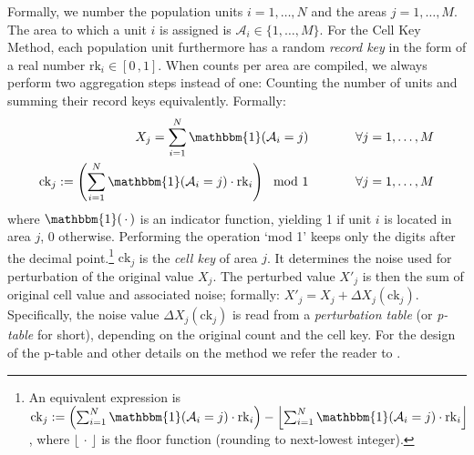 Formally, we number the population units $i = 1, \dots, N$ and the areas $j = 1, \dots, M$. The area to which a unit $i$ is assigned is $\mathcal{A}_i \in \{1, \dots, M\}$. For the Cell Key Method, each population unit furthermore has a random \emph{record key} in the form of a real number $\mathrm{rk}_i \in [0 \,, 1]$. When counts per area are compiled, we always perform two aggregation steps instead of one: Counting the number of units and summing their record keys equivalently. Formally:
\begin{equation}
\begin{aligned}
    X_j = \sum_{i=1}^N \mathbbm{1}(\mathcal{A}_i = j) \hspace{1.3cm} \forall j = 1, \dots, M \\
    \mathrm{ck}_j := \left(\sum_{i=1}^N \mathbbm{1}(\mathcal{A}_i = j) \cdot \mathrm{rk}_i \right) \mod 1 \hspace{1.3cm} \forall j = 1, \dots, M
\end{aligned}
\end{equation}
where $\mathbbm{1}(\,\cdot\,)$ is an indicator function, yielding 1 if unit $i$ is located in area $j$, 0 otherwise. Performing the operation `mod 1' keeps only the digits after the decimal point.\footnote{
    An equivalent expression is $\mathrm{ck}_j := \left (\sum_{i=1}^N \mathbbm{1}(\mathcal{A}_i = j) \cdot \mathrm{rk}_i \right ) - \left\lfloor \sum_{i=1}^N \mathbbm{1}(\mathcal{A}_i = j) \cdot \mathrm{rk}_i \right \rfloor$, where $\lfloor\,\cdot\,\rfloor$ is the floor function (rounding to next-lowest integer).
}
$\mathrm{ck}_j$ is the \emph{cell key} of area $j$. It determines the noise used for perturbation of the original value $X_j$. The perturbed value $X'_j$ is then the sum of original cell value and associated noise; formally: $X'_j = X_j + \Delta X_j(\mathrm{ck}_j)$. Specifically, the noise value $\Delta X_j(\mathrm{ck}_j)$ is read from a \emph{perturbation table} (or \emph{p-table} for short), depending on the original count and the cell key. For the design of the p-table and other details on the method we refer the reader to \citet[5.4]{HundepoolEtAl2024}.

